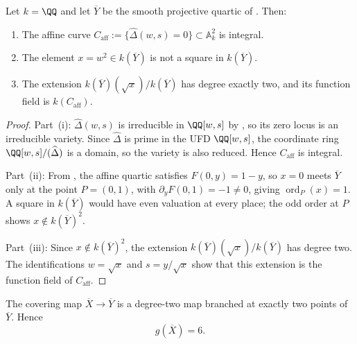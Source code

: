 \begin{lemma}
  \label{lem:integral-function-field}
  Let \(k=\QQ\) and let \(\overline{Y}\) be the smooth projective quartic
  of . Then:
  \begin{enumerate}[label=\textup{(\roman*)}]
    \item The affine curve \(C_{\mathrm{aff}}:=\{\widehat\Delta(w,s)=0\}
          \subset\mathbb{A}^2_k\) is integral.
    \item The element \(x=w^2\in k(\overline{Y})\) is not a square
          in \(k(\overline{Y})\).
    \item The extension \(k(\overline{Y})(\sqrt{x})/k(\overline{Y})\)
          has degree exactly two, and its function field is \(k(C_{\mathrm{aff}})\).
  \end{enumerate}
\end{lemma}

\begin{proof}

Part~(i): \(\widehat\Delta(w,s)\) is irreducible in \(\QQ[w,s]\) by
, so its zero locus is an irreducible
variety. Since \(\widehat\Delta\) is prime in the UFD \(\QQ[w,s]\), the
coordinate ring \(\QQ[w,s]/(\widehat\Delta)\) is a domain, so the
variety is also reduced. Hence \(C_{\mathrm{aff}}\) is integral.

Part~(ii): From , the affine quartic
satisfies \(F(0,y)=1-y\), so \(x=0\) meets \(\overline{Y}\) only at
the point \(P=(0,1)\), with \(\partial_y F(0,1)=-1\neq 0\), giving
\(\operatorname{ord}_P(x)=1\). A square in \(k(\overline{Y})\) would
have even valuation at every place; the odd order at \(P\) shows
\(x\notin k(\overline{Y})^2\).

Part~(iii): Since \(x\notin k(\overline{Y})^2\), the extension
\(k(\overline{Y})(\sqrt{x})/k(\overline{Y})\) has degree two. The
identifications \(w=\sqrt{x}\) and \(s=y/\sqrt{x}\) show that this
extension is the function field of \(C_{\mathrm{aff}}\).

\end{proof}

\begin{proposition}
  \label{prop:sync-hatdelta-double-cover}
  The covering map \(\overline{X}\to\overline{Y}\) is a degree-two map
  branched at exactly two points of \(\overline{Y}\). Hence
  \[
    g(\overline{X})=6.
  \]
\end{proposition}

